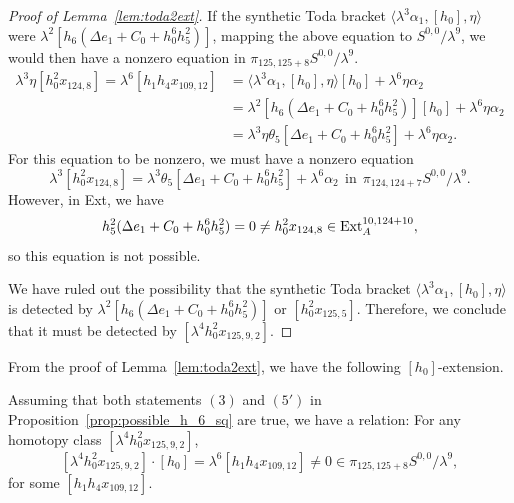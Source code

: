 \documentclass{amsart}
\numberwithin{equation}{section}
\begin{document}
\begin{proof}[Proof of Lemma~\ref{lem:toda2ext}]
If the synthetic Toda bracket $\langle \lambda^3 \alpha_1, [h_0], \eta \rangle$ were $\lambda^2 [h_6(\Delta e_1 +C_0+h_0^6h_5^2)]$, mapping the above equation to $S^{0,0}/\lambda^9$, we would then have a nonzero equation in $\pi_{125,125+8} S^{0,0}/\lambda^9$.
\begin{align*}
    \lambda^3 \eta [h_0^2 x_{124,8}] = \lambda^6 [h_1h_4x_{109,12}] & = \langle \lambda^3 \alpha_1, [h_0], \eta \rangle [h_0] + \lambda^6 \eta \alpha_2 \\ & = \lambda^2 [h_6(\Delta e_1 +C_0+h_0^6h_5^2)] [h_0] + \lambda^6 \eta \alpha_2\\ & = \lambda^3 \eta \theta_5 [\Delta e_1 +C_0+h_0^6h_5^2] + \lambda^6 \eta \alpha_2.
\end{align*}
For this equation to be nonzero, we must have a nonzero equation
$$\lambda^3 [h_0^2 x_{124,8}] = \lambda^3 \theta_5 [\Delta e_1 +C_0+h_0^6h_5^2] + \lambda^6 \alpha_2 \ \ \text{in} \ \ \pi_{124,124+7} S^{0,0}/\lambda^9.$$
However, in Ext, we have 
$$h_5^2 (\Delta e_1 +C_0+h_0^6h_5^2) = 0 \neq h_0^2 x_{124,8} \in \mathrm{Ext}_A^{10,124+10},$$
so this equation is not possible.


We have ruled out the possibility that the synthetic Toda bracket $\langle \lambda^3 \alpha_1, [h_0], \eta \rangle$ is detected by $\lambda^2 [h_6(\Delta e_1 +C_0+h_0^6h_5^2)]$ or $[h_0^2 x_{125,5}]$. Therefore, we conclude that it must be detected by $[\lambda^4 h_0^2 x_{125,9,2}]$.
\end{proof}

From the proof of Lemma~\ref{lem:toda2ext}, we have the following $[h_0]$-extension.

\begin{corollary} \label{cor:2ext125}
    Assuming that both statements $(3)$ and $(5')$ in Proposition~\ref{prop:possible_h_6_sq} are true, we have a relation: For any homotopy class $[\lambda^4 h_0^2x_{125,9,2}]$,
    $$[\lambda^4 h_0^2x_{125,9,2}] \cdot [h_0] = \lambda^6 [h_1h_4x_{109,12}] \neq 0 \in \pi_{125,125+8} S^{0,0}/\lambda^9,$$
    for some $[h_1h_4x_{109,12}]$.
\end{corollary}
\end{document}
